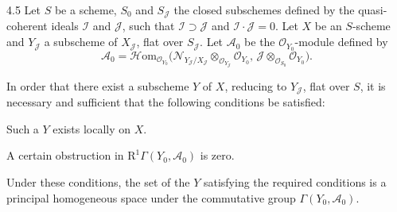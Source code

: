 \begin{proposition}{4.5}
\label{III.4.5}
Let \(S\) be a scheme, \(S_{0}\) and \(S_{\mathcal{J}}\) the closed subschemes defined by the quasi-coherent ideals \(\mathcal{I}\) and \(\mathcal{J}\), such that \(\mathcal{I}\supset\mathcal{J}\) and \(\mathcal{I}\cdot\mathcal{J}=0\). Let \(X\) be an \(S\)-scheme and \(Y_{\mathcal{J}}\) a subscheme of \(X_{\mathcal{J}}\), flat over \(S_{\mathcal{J}}\). Let \(\mathcal{A}_{0}\) be the \(\mathcal{O}_{Y_{0}}\)-module defined by
\[
\mathcal{A}_{0}
=
\mathcal{H}\mathrm{om}_{\mathcal{O}_{Y_{0}}}\bigl(\mathcal{N}_{Y_{\mathcal{J}}/X_{\mathcal{J}}}\otimes_{\mathcal{O}_{Y_{\mathcal{J}}}}\mathcal{O}_{Y_{0}},\,\mathcal{J}\otimes_{\mathcal{O}_{S_{0}}}\mathcal{O}_{Y_{0}}\bigr).
\]
\begin{enumeratei}
\item In order that there exist a subscheme \(Y\) of \(X\), reducing to \(Y_{\mathcal{J}}\), flat over \(S\), it is necessary and sufficient that the following conditions be satisfied:
\begin{enumeratea}
\item Such a \(Y\) exists locally on \(X\).
\item A certain obstruction in \(\mathrm{R}^{1}\Gamma(Y_{0},\mathcal{A}_{0})\) is zero.%
{\renewcommand{\thefootnote}{(84)}}
\end{enumeratea}
\item Under these conditions, the set of the \(Y\) satisfying the required conditions is a principal homogeneous space under the commutative group \(\Gamma(Y_{0},\mathcal{A}_{0})\).
\end{enumeratei}
\end{proposition}

